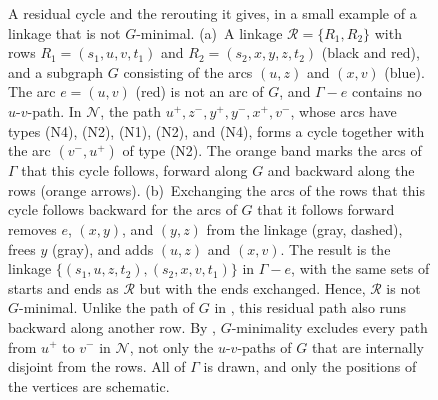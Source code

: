 \documentclass[fontsize=12pt,leading=14pt]{fullpaper}
\newcommand{\Ncal}{\mathcal{N}}
\newcommand{\Rcal}{\mathcal{R}}
\begin{document}
\begin{figure}[ht]
  \caption{A residual cycle and the rerouting it gives, in a small example of a linkage that is not $G$-minimal.
    (a)~A linkage $\Rcal=\{R_1,R_2\}$ with rows $R_1=(s_1,u,v,t_1)$ and $R_2=(s_2,x,y,z,t_2)$ (black and red), and a subgraph $G$ consisting of the arcs $(u,z)$ and $(x,v)$ (blue).
    The arc $e=(u,v)$ (red) is not an arc of $G$, and $\Gamma-e$ contains no $u$-$v$-path.
    In $\Ncal$, the path $u^+,z^-,y^+,y^-,x^+,v^-$, whose arcs have types (N4), (N2), (N1), (N2), and (N4), forms a cycle together with the arc $(v^-,u^+)$ of type (N2).
    The orange band marks the arcs of $\Gamma$ that this cycle follows, forward along $G$ and backward along the rows (orange arrows).
    (b)~Exchanging the arcs of the rows that this cycle follows backward for the arcs of $G$ that it follows forward removes $e$, $(x,y)$, and $(y,z)$ from the linkage (gray, dashed), frees $y$ (gray), and adds $(u,z)$ and $(x,v)$.
    The result is the linkage $\{(s_1,u,z,t_2),(s_2,x,v,t_1)\}$ in $\Gamma-e$, with the same sets of starts and ends as $\Rcal$ but with the ends exchanged.
    Hence, $\Rcal$ is not $G$-minimal.
    Unlike the path of $G$ in , this residual path also runs backward along another row.
    By , $G$-minimality excludes every path from $u^+$ to $v^-$ in $\Ncal$, not only the $u$-$v$-paths of $G$ that are internally disjoint from the rows.
  All of $\Gamma$ is drawn, and only the positions of the vertices are schematic.}
  \label{fig:residual-cycle}
\end{figure}
\end{document}
